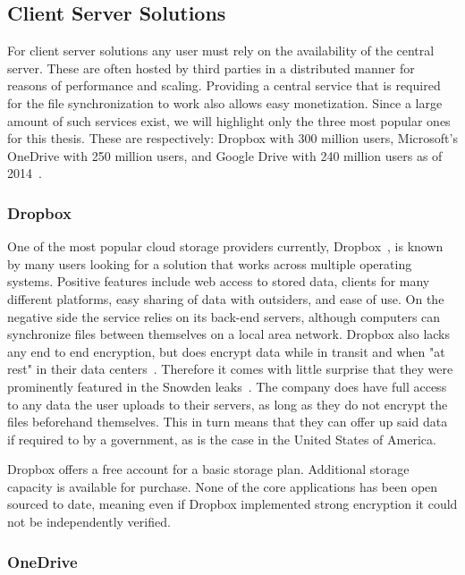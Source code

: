 \subsection{Client Server Solutions}

For client server solutions any user must rely on the availability of the central server.
These are often hosted by third parties in a distributed manner for reasons of performance and scaling.
Providing a central service that is required for the file synchronization to work also allows easy monetization.
Since a large amount of such services exist, we will highlight only the three most popular ones for this thesis.
These are respectively: Dropbox with 300 million users, Microsoft's OneDrive with 250 million users, and Google Drive with 240 million users as of 2014~\cite{web:site:fortune}.

\subsubsection{Dropbox}

One of the most popular cloud storage providers currently, Dropbox~\cite{web:site:dropbox}, is known by many users looking for a solution that works across multiple operating systems.
Positive features include web access to stored data, clients for many different platforms, easy sharing of data with outsiders, and ease of use.
On the negative side the service relies on its back-end servers, although computers can synchronize files between themselves on a local area network.
Dropbox also lacks any end to end encryption, but does encrypt data while in transit and when "at rest" in their data centers~\cite{web:site:dropbox:blog}.
Therefore it comes with little surprise that they were prominently featured in the Snowden leaks~\cite{web:site:rt:dropbox}.
The company does have full access to any data the user uploads to their servers, as long as they do not encrypt the files beforehand themselves.
This in turn means that they can offer up said data if required to by a government, as is the case in the United States of America.

Dropbox offers a free account for a basic storage plan.
Additional storage capacity is available for purchase.
None of the core applications has been open sourced to date, meaning even if Dropbox implemented strong encryption it could not be independently verified.

\subsubsection{OneDrive}

